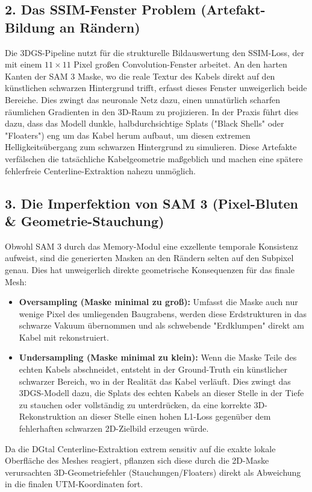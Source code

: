\documentclass[12pt,a4paper]{article}
\begin{document}
\subsection*{2. Das SSIM-Fenster Problem (Artefakt-Bildung an Rändern)}
Die 3DGS-Pipeline nutzt für die strukturelle Bildauswertung den SSIM-Loss, der mit einem $11\times11$ Pixel großen Convolution-Fenster arbeitet. An den harten Kanten der SAM 3 Maske, wo die reale Textur des Kabels direkt auf den künstlichen schwarzen Hintergrund trifft, erfasst dieses Fenster unweigerlich beide Bereiche. Dies zwingt das neuronale Netz dazu, einen unnatürlich scharfen räumlichen Gradienten in den 3D-Raum zu projizieren. In der Praxis führt dies dazu, dass das Modell dunkle, halbdurchsichtige Splats ("Black Shells" oder "Floaters") eng um das Kabel herum aufbaut, um diesen extremen Helligkeitsübergang zum schwarzen Hintergrund zu simulieren. Diese Artefakte verfälschen die tatsächliche Kabelgeometrie maßgeblich und machen eine spätere fehlerfreie Centerline-Extraktion nahezu unmöglich.

\subsection*{3. Die Imperfektion von SAM 3 (Pixel-Bluten \& Geometrie-Stauchung)}
Obwohl SAM 3 durch das Memory-Modul eine exzellente temporale Konsistenz aufweist, sind die generierten Masken an den Rändern selten auf den Subpixel genau. Dies hat unweigerlich direkte geometrische Konsequenzen für das finale Mesh:
\begin{itemize}
    \item \textbf{Oversampling (Maske minimal zu groß):} Umfasst die Maske auch nur wenige Pixel des umliegenden Baugrabens, werden diese Erdstrukturen in das schwarze Vakuum übernommen und als schwebende "Erdklumpen" direkt am Kabel mit rekonstruiert.
    \item \textbf{Undersampling (Maske minimal zu klein):} Wenn die Maske Teile des echten Kabels abschneidet, entsteht in der Ground-Truth ein künstlicher schwarzer Bereich, wo in der Realität das Kabel verläuft. Dies zwingt das 3DGS-Modell dazu, die Splats des echten Kabels an dieser Stelle in der Tiefe zu stauchen oder vollständig zu unterdrücken, da eine korrekte 3D-Rekonstruktion an dieser Stelle einen hohen L1-Loss gegenüber dem fehlerhaften schwarzen 2D-Zielbild erzeugen würde.
\end{itemize}
Da die DGtal Centerline-Extraktion extrem sensitiv auf die exakte lokale Oberfläche des Meshes reagiert, pflanzen sich diese durch die 2D-Maske verursachten 3D-Geometriefehler (Stauchungen/Floaters) direkt als Abweichung in die finalen UTM-Koordinaten fort.
\end{document}

